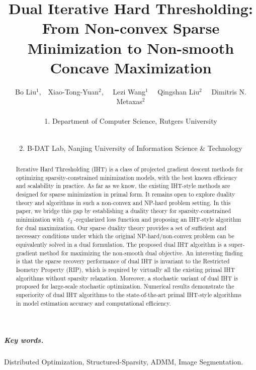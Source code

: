\documentclass[11pt]{article}
\title{Dual Iterative Hard Thresholding: From Non-convex Sparse Minimization to Non-smooth Concave Maximization}
\author{
  Bo Liu$^{1}$,\ \  Xiao-Tong-Yuan$^{2}$, \ \ Lezi Wang$^{1}$ \ \ Qingshan Liu$^{2}$ \ \ Dimitris N. Metaxas$^{2}$\\\\
  1. Department of Computer Science, Rutgers University \\
  \\
  \and
  2. B-DAT Lab, Nanjing University of Information Science \& Technology \\
 }
\date{}
\numberwithin{equation}{section}
\numberwithin{table}{section}
\numberwithin{figure}{section}
\begin{document}
\maketitle

\begin{abstract}
Iterative Hard Thresholding (IHT) is a class of projected gradient descent methods for optimizing sparsity-constrained minimization models, with the best known efficiency and scalability in practice. As far as we know, the existing IHT-style methods are designed for sparse minimization in primal form. It remains open to explore duality theory and algorithms in such a non-convex and NP-hard problem setting. In this paper, we bridge this gap by establishing a duality theory for sparsity-constrained minimization with $\ell_2$-regularized loss function and proposing an IHT-style algorithm for dual maximization. Our sparse duality theory provides a set of sufficient and necessary conditions under which the original NP-hard/non-convex problem can be equivalently solved in a dual formulation. The proposed dual IHT algorithm is a super-gradient method for maximizing the non-smooth dual objective. An interesting finding is that the sparse recovery performance of dual IHT is invariant to the Restricted Isometry Property (RIP), which is required by virtually all the existing primal IHT algorithms without sparsity relaxation. Moreover, a stochastic variant of dual IHT is proposed for large-scale stochastic optimization. Numerical results demonstrate the superiority of dual IHT algorithms to the state-of-the-art primal IHT-style algorithms in model estimation accuracy and computational efficiency.
\end{abstract}

\subparagraph{Key words.} Distributed Optimization, Structured-Sparsity, ADMM, Image Segmentation.

\end{document}
